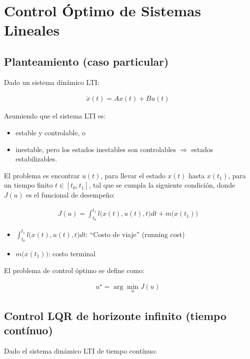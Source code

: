 \chapter{Control Óptimo de Sistemas Lineales}

\section{Planteamiento (caso particular)}

Dado un sistema dinámico LTI:

\begin{align*}
    \dot{x}(t) = A x(t) + B u(t)
\end{align*}

Asumiendo que el sistema LTI es:

\begin{itemize}
    \item estable y controlable, o
    \item inestable, pero los estados inestables son controlables $\Longrightarrow$ estados estabilizables.
\end{itemize}

El problema es encontrar $u(t)$, para llevar el estado $x(t)$ hasta $x(t_1)$, para un tiempo finito $t\in[t_0,t_1]$, tal que se cumpla la siguiente condición, donde $J(u)$ es el funcional de desempeño:

\begin{align*}
    J(u) = \int_{t_0}^{t_1} l \big( x(t), u(t), t \big) dt + m \big( x(t_1) \big)
\end{align*}

\begin{itemize}
    \item $\int_{t_0}^{t_1}l\big(x(t),u(t),t\big)dt$: ``Costo de viaje'' (running cost)
    \item $m\big(x(t_1)\big)$: costo terminal
\end{itemize}

El problema de control óptimo se define como:

\begin{align*}
    u^\star = \arg \min_u J(u)
\end{align*}

\section{Control LQR de horizonte infinito (tiempo contínuo)}

Dado el sistema dinámico LTI de tiempo contínuo:

